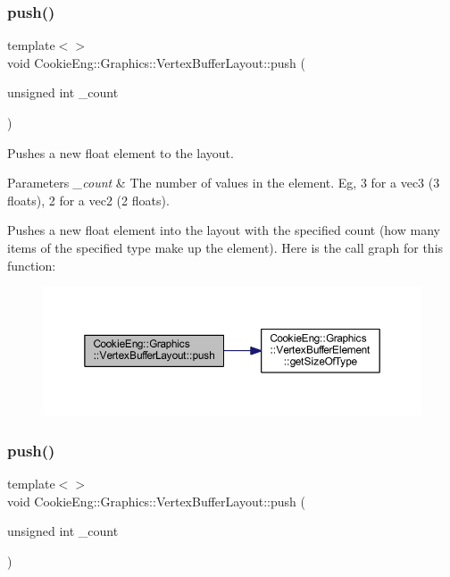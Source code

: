 \subsubsection{push()\hspace{0.1cm}{\footnotesize\ttfamily [2/4]}}
{\footnotesize\ttfamily template$<$$>$ \\
void Cookie\+Eng\+::\+Graphics\+::\+Vertex\+Buffer\+Layout\+::push (\begin{DoxyParamCaption}\item[{unsigned int}]{\+\_\+count }\end{DoxyParamCaption})\hspace{0.3cm}{\ttfamily [inline]}}



Pushes a new float element to the layout. 


\begin{DoxyParams}{Parameters}
{\em \+\_\+count} & The number of values in the element. Eg, 3 for a vec3 (3 floats), 2 for a vec2 (2 floats).\\
\hline
\end{DoxyParams}
Pushes a new float element into the layout with the specified count (how many items of the specified type make up the element). Here is the call graph for this function\+:
\nopagebreak
\begin{figure}[H]
\begin{center}
\leavevmode
\includegraphics[width=350pt]{class_cookie_eng_1_1_graphics_1_1_vertex_buffer_layout_a3f1a639714762ec45edf48a68995d7bd_cgraph}
\end{center}
\end{figure}
\mbox{\label{class_cookie_eng_1_1_graphics_1_1_vertex_buffer_layout_a3f1a639714762ec45edf48a68995d7bd}} 
\subsubsection{push()\hspace{0.1cm}{\footnotesize\ttfamily [3/4]}}
{\footnotesize\ttfamily template$<$$>$ \\
void Cookie\+Eng\+::\+Graphics\+::\+Vertex\+Buffer\+Layout\+::push (\begin{DoxyParamCaption}\item[{unsigned int}]{\+\_\+count }\end{DoxyParamCaption})\hspace{0.3cm}{\ttfamily [inline]}}



